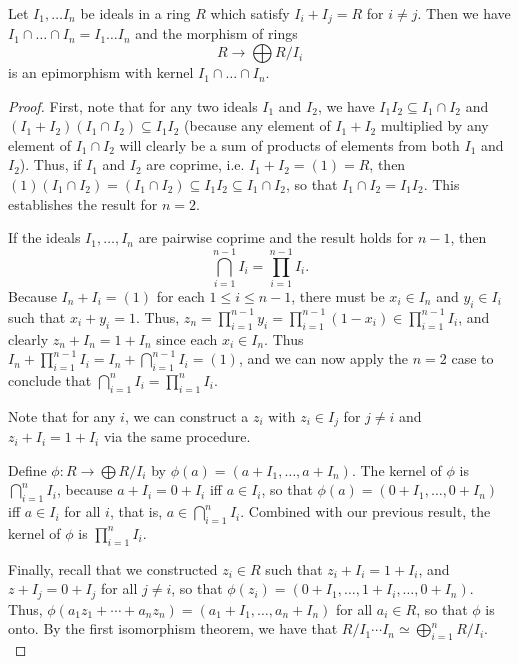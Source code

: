 \begin{theorem} Let $I_1, \dots I_n$ be ideals in a
ring $R$ which satisfy $I_i + I_j = R$ for $i \neq j$. Then we have $I_1 \cap
\dots \cap I_n = I_1 \dots I_n$ and the morphism of rings
\[ R \to \bigoplus R/I_i \]
is an epimorphism with kernel $I_1 \cap \dots \cap I_n$.
\end{theorem} 

\begin{proof} 
First, note that for any two ideals $I_1$ and $I_2$, we
have $I_1I_2\subseteq I_1\cap I_2$ and $(I_1+I_2)(I_1\cap I_2)\subseteq
I_1I_2$ (because any element of $I_1+I_2$ multiplied by any element of
$I_1\cap I_2$ will clearly be a sum of products of elements from both $I_1$
and $I_2$). Thus, if $I_1$ and $I_2$ are coprime, i.e. $I_1+I_2=(1)=R$,
then $(1)(I_1\cap I_2)=(I_1\cap I_2)\subseteq I_1I_2\subseteq I_1\cap I_2$,
so that $I_1\cap I_2=I_1I_2$. This establishes the result for $n=2$.

If the
ideals $I_1,\ldots,I_n$ are pairwise coprime and the result holds for $n-1$,
then $$\bigcap_{i=1}^{n-1} I_i=\prod_{i=1}^{n-1}I_i.$$  Because $I_n+I_i=(1)$
for each $1\leq i\leq n-1$, there must be $x_i\in I_n$ and $y_i\in I_i$ such
that $x_i+y_i=1$. Thus, $z_n=\prod_{i=1}^{n-1}y_i=\prod_{i=1}^{n-1}(1-x_i)\in
\prod_{i=1}^{n-1} I_i$, and clearly $z_n+I_n=1+I_n$ since each $x_i\in
I_n$. Thus $I_n+\prod_{i=1}^{n-1}I_i=I_n+\bigcap_{i=1}^{n-1}I_i=(1)$,
and we can now apply the $n=2$ case to conclude that $\bigcap_{i=1}^n
I_i=\prod_{i=1}^n I_i$. 

Note that for any $i$, we can construct a $z_i$
with $z_i\in I_j$ for $j\neq i$ and $z_i+I_i=1+I_i$ via the same procedure.

 Define $\phi:R\rightarrow\bigoplus R/I_i$
by $\phi(a)=(a+I_1,\ldots,a+I_n)$. The kernel of $\phi$ is
$\bigcap_{i=1}^n I_i$, because $a+I_i=0+I_i$ iff $a\in I_i$, so that
$\phi(a)=(0+I_1,\ldots,0+I_n)$ iff $a\in I_i$ for all $i$, that is,
$a\in\bigcap_{i=1}^n I_i$. Combined with our previous result, the kernel
of $\phi$ is $\prod_{i=1}^n I_i$.

Finally, recall that we constructed
$z_i\in R$ such that $z_i+I_i=1+I_i$, and $z+I_j=0+I_j$ for all $j\neq
i$, so that $\phi(z_i)=(0+I_1,\ldots,1+I_{i},\ldots,0+I_n)$. Thus,
$\phi(a_1z_1+\cdots+a_nz_n)=(a_1+I_1,\ldots,a_n+I_n)$ for all $a_i\in R$,
so that $\phi$ is onto. By the first isomorphism theorem, we have that
$R/I_1\cdots I_n\simeq \bigoplus_{i=1}^nR/I_i$.   \\

\end{proof} 

